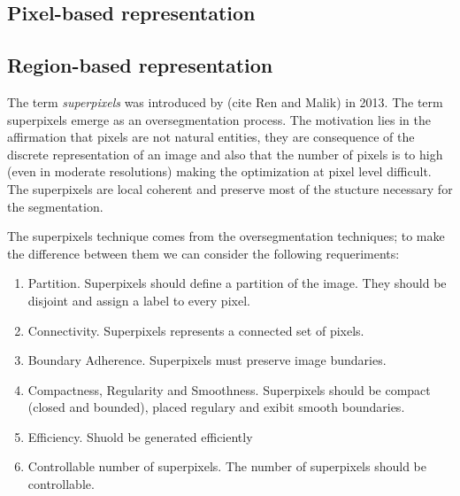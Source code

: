 \subsection{Pixel-based representation}


\subsection{Region-based representation}
The term \textit{superpixels} was introduced by (cite Ren and Malik) in 2013. The term superpixels emerge as an oversegmentation process. The motivation lies in the affirmation that pixels are not natural entities, they are consequence of the discrete representation of an image and also that the number of pixels is to high (even in moderate resolutions) making the optimization at pixel level difficult. The superpixels are local coherent and preserve most of the stucture necessary for the segmentation.  

The superpixels technique comes from the oversegmentation techniques; to make the difference between them we can consider the following requeriments:
\begin{enumerate}
 \item Partition. Superpixels should define a partition of the image. They should be disjoint and assign a label to every pixel.
 \item Connectivity. Superpixels represents a connected set of pixels.
 \item Boundary Adherence. Superpixels must preserve image bundaries.
 \item Compactness, Regularity and Smoothness. Superpixels should be compact (closed and bounded), placed regulary and exibit smooth boundaries.
 \item Efficiency. Shuold be generated efficiently
 \item Controllable number of superpixels. The number of superpixels should be controllable.
\end{enumerate}

